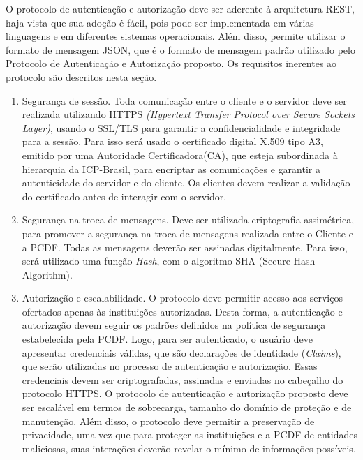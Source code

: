 O protocolo de autenticação e autorização deve ser aderente à arquitetura REST, haja vista que sua adoção é fácil, pois pode ser implementada em várias linguagens e em diferentes sistemas operacionais.  Além disso, permite utilizar o formato de mensagem JSON, que é o formato de mensagem padrão utilizado pelo Protocolo de Autenticação e Autorização proposto. Os requisitos inerentes ao protocolo são descritos nesta seção.

\begin{enumerate}[RQ1]

\item Segurança de sessão. Toda comunicação entre o cliente e o servidor deve ser realizada utilizando HTTPS
\emph{(Hypertext Transfer Protocol over Secure Sockets Layer)}, usando o SSL/TLS para garantir a confidencialidade
e integridade para a sessão. Para isso será usado o certificado digital X.509 tipo A3, emitido por uma Autoridade Certificadora(CA), que esteja subordinada à hierarquia da ICP-Brasil, para encriptar as comunicações e garantir a autenticidade do servidor e do cliente. Os clientes devem realizar a validação do certificado antes de interagir com o servidor.

\item Segurança na troca de mensagens. Deve ser utilizada criptografia assimétrica, para promover a segurança na troca de mensagens realizada entre o Cliente e a PCDF. Todas as mensagens deverão ser assinadas digitalmente. Para isso, será utilizado uma função \emph{Hash}, com o algoritmo SHA (Secure Hash Algorithm).

\item Autorização e escalabilidade. O protocolo deve permitir acesso aos serviços ofertados apenas às instituições autorizadas. Desta forma, a autenticação e autorização devem seguir os padrões definidos na política de segurança estabelecida pela PCDF. Logo, para ser autenticado, o usuário deve apresentar credenciais válidas, que são declarações de identidade (\emph{Claims}), que serão utilizadas no processo de autenticação e autorização. Essas credenciais devem ser criptografadas, assinadas e enviadas no cabeçalho do protocolo HTTPS.
    O protocolo de autenticação e autorização proposto deve ser escalável em termos de sobrecarga, tamanho do domínio de proteção e de manutenção. Além disso, o protocolo deve permitir a preservação de privacidade, uma vez que para proteger as instituições e a PCDF de entidades maliciosas, suas interações deverão revelar o mínimo de informações possíveis.


\end{enumerate}
